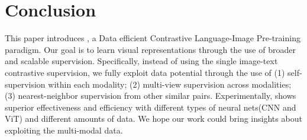 \section{Conclusion}
This paper introduces \workname, a Data efficient Contrastive Language-Image Pre-training paradigm. Our goal is to learn visual representations through the use of broader and scalable supervision. Specifically, instead of using the single image-text contrastive supervision, we fully exploit data potential through the use of (1) self-supervision within each modality; (2) multi-view supervision across modalities; (3) nearest-neighbor supervision from other similar pairs. Experimentally, \workname shows superior effectiveness and efficiency with different types of neural nets(CNN and ViT) and different amounts of data. We hope our work could bring insights about exploiting the multi-modal data.

